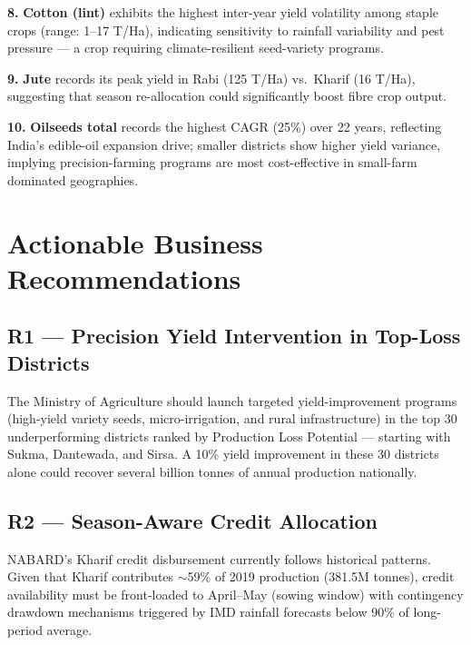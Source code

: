 \documentclass[10pt]{article}
\begin{document}
\vspace{3pt}

\begin{insightbox}
  \textbf{8.} \textbf{Cotton (lint)} exhibits the highest inter-year yield
  volatility among staple crops (range: 1–17 T/Ha), indicating sensitivity to
  rainfall variability and pest pressure — a crop requiring climate-resilient
  seed-variety programs.
\end{insightbox}

\vspace{3pt}

\begin{insightbox}
  \textbf{9.} \textbf{Jute} records its peak yield in Rabi (125 T/Ha) vs.\
  Kharif (16 T/Ha), suggesting that season re-allocation could significantly
  boost fibre crop output.
\end{insightbox}

\vspace{3pt}

\begin{insightbox}
  \textbf{10.} \textbf{Oilseeds total} records the highest CAGR (25\%) over 22 years,
  reflecting India's edible-oil expansion drive; smaller districts show higher yield
  variance, implying precision-farming programs are most cost-effective in small-farm
  dominated geographies.
\end{insightbox}

\section{Actionable Business Recommendations}

\subsection{R1 — Precision Yield Intervention in Top-Loss Districts}
The Ministry of Agriculture should launch targeted yield-improvement programs
(high-yield variety seeds, micro-irrigation, and rural infrastructure) in the top 30
underperforming districts ranked by Production Loss Potential — starting with Sukma,
Dantewada, and Sirsa. A 10\% yield improvement in these 30 districts alone could
recover several billion tonnes of annual production nationally.

\subsection{R2 — Season-Aware Credit Allocation}
NABARD's Kharif credit disbursement currently follows historical patterns.
Given that Kharif contributes $\sim$59\% of 2019 production (381.5M tonnes),
credit availability must be front-loaded to April–May (sowing window) with
contingency drawdown mechanisms triggered by IMD rainfall forecasts below
90\% of long-period average.
\end{document}
